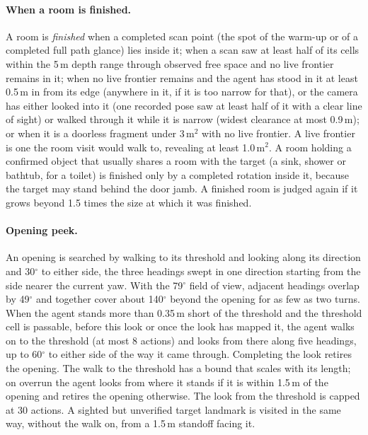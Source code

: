 \documentclass[10pt]{article}
\begin{document}
\paragraph{When a room is finished.}
A room is \emph{finished} when a completed scan point (the spot of the warm-up or of a completed full path glance)
lies inside it; when a scan saw at least half of its cells within the 5\,m depth range through observed free space and
no live frontier remains in it; when no live frontier remains and the agent has stood in it at least 0.5\,m in from
its edge (anywhere in it, if it is too narrow for that), or the camera has either looked into it (one recorded pose
saw at least half of it with a clear line of sight) or walked through it while it is narrow (widest clearance at most
0.9\,m); or when it is a doorless fragment under 3\,m$^2$ with no live frontier. A live frontier is one the room visit
would walk to, revealing at least 1.0\,m$^2$. A room holding a confirmed object that usually shares a room with the
target (a sink, shower or bathtub, for a toilet) is finished only by a completed rotation inside it, because the
target may stand behind the door jamb. A finished room is judged
again if it grows beyond 1.5 times the size at which it was finished.

\paragraph{Opening peek.}
An opening is searched by walking to its threshold and looking along its direction and 30$^\circ$ to either side, the
three headings swept in one direction starting from the side nearer the current yaw. With the 79$^\circ$ field of
view, adjacent headings overlap by 49$^\circ$ and together cover about 140$^\circ$ beyond the opening for as few as
two turns. When the agent stands more than 0.35\,m short of the threshold and the threshold cell is passable, before
this look or once the look has mapped it, the agent walks on to the threshold (at most 8 actions) and looks from there
along five headings, up to 60$^\circ$ to either side of the way it came through. Completing the look retires the
opening. The walk to the threshold has a bound that scales with
its length; on overrun the agent looks from where it stands if it is within 1.5\,m of the opening and retires the
opening otherwise. The look from the threshold is capped at 30 actions. A sighted but unverified target landmark is
visited in the same way, without the walk on, from a 1.5\,m standoff facing it.
\end{document}
